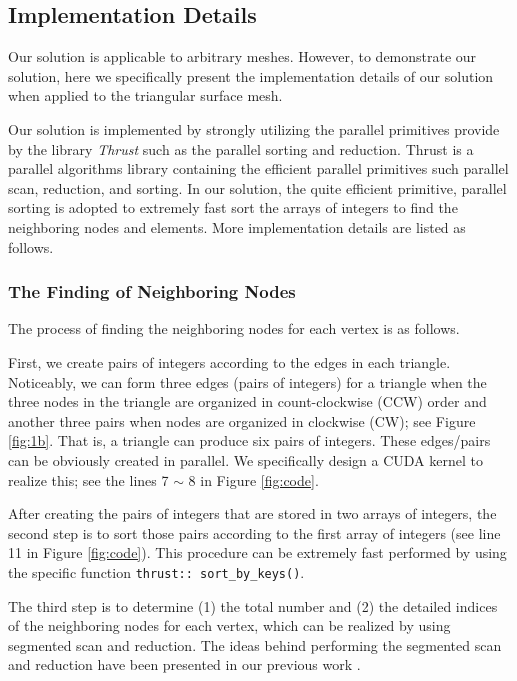 \documentclass[twocolumn]{svjour3}          \smartqed  \usepackage{graphicx}
\begin{document}
\subsection{Implementation Details}

Our solution is applicable to arbitrary meshes. However, to demonstrate our 
solution, here we specifically present the implementation details of our 
solution when applied to the triangular surface mesh. 

Our solution is implemented by strongly utilizing the parallel primitives 
provide by the library \textit{Thrust} \cite{10_Bell2012359} such as the parallel sorting and 
reduction. Thrust is a parallel algorithms library containing the efficient 
parallel primitives such parallel scan, reduction, and sorting. In our 
solution, the quite efficient primitive, parallel sorting is adopted to 
extremely fast sort the arrays of integers to find the neighboring nodes and 
elements. More implementation details are listed as follows.

\subsubsection{The Finding of Neighboring Nodes}

The process of finding the neighboring nodes for each vertex is as follows.

First, we create pairs of integers according to the edges in each triangle. 
Noticeably, we can form three edges (pairs of integers) for a triangle when 
the three nodes in the triangle are organized in count-clockwise (CCW) order 
and another three pairs when nodes are organized in clockwise (CW); see 
Figure \ref{fig:1b}. That is, a triangle can produce six pairs of integers. These 
edges/pairs can be obviously created in parallel. We specifically design a 
CUDA kernel to realize this; see the lines 7 $\sim $ 8 in Figure \ref{fig:code}.

After creating the pairs of integers that are stored in two arrays of 
integers, the second step is to sort those pairs according to the first 
array of integers (see line 11 in Figure \ref{fig:code}). This procedure can be 
extremely fast performed by using the specific function \texttt{thrust:: 
	sort{\_}by{\_}keys()}. 

The third step is to determine (1) the total number and (2) the 
detailed indices of the neighboring nodes for each vertex, which can be 
realized by using segmented scan and reduction. The ideas behind performing 
the segmented scan and reduction have been presented in our previous work \cite{11_Mei2016}.
\end{document}
